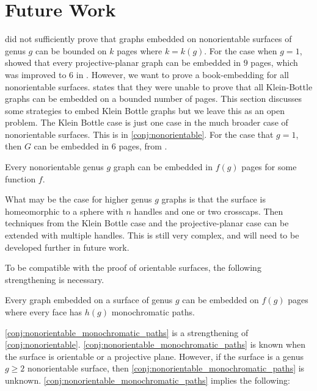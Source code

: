 
\section{Future Work}

\textcite{heathEmbeddingPlanarGraphs1984} did not sufficiently prove that graphs embedded on nonorientable surfaces of genus $g$ can be bounded on $k$ pages where $k = k(g)$. For the case when $g = 1$, \textcite{nakamotoBookEmbeddingProjectiveplanar2015} showed that every projective-planar graph can be embedded in $9$ pages, which was improved to 6 in \textcite{ozekiBookEmbeddingGraphs2019}. However, we want to prove a book-embedding for all nonorientable surfaces. 
\textcite{ozekiBookEmbeddingGraphs2019} states that they were unable to prove that all Klein-Bottle graphs can be embedded on a bounded number of pages. This section discusses some strategies to embed Klein Bottle graphs but we leave this as an open problem. The Klein Bottle case is just one case in the much broader case of nonorientable surfaces. This is in \cref{conj:nonorientable}. For the case that $g = 1$, then $G$ can be embedded in 6 pages, from \textcite{ozekiBookEmbeddingGraphs2019}. 
\begin{conjecture}\label{conj:nonorientable}
	Every nonorientable genus $g$ graph can be embedded in $f(g)$ pages for some function $f$. 
\end{conjecture}

What may be the case for higher genus $g$ graphs is that the surface is homeomorphic to a sphere with $n$ handles and one or two crosscaps. Then techniques from the Klein Bottle case and the projective-planar case can be extended with multiple handles. This is still very complex, and will need to be developed further in future work.

To be compatible with the proof of orientable surfaces, the following strengthening is necessary. 
\begin{conjecture}\label{conj:nonorientable_monochromatic_paths}
	Every graph embedded on a surface of genus $g$ can be embedded on $f(g)$ pages where every face has $h(g)$ monochromatic paths. 
\end{conjecture}

\cref{conj:nonorientable_monochromatic_paths} is a strengthening of \cref{conj:nonorientable}. \cref{conj:nonorientable_monochromatic_paths} is known when the surface is orientable or a projective plane. However, if the surface is a genus $g \geq 2$ nonorientable surface, then \cref{conj:nonorientable_monochromatic_paths} is unknown. 
\cref{conj:nonorientable_monochromatic_paths} implies the following:

